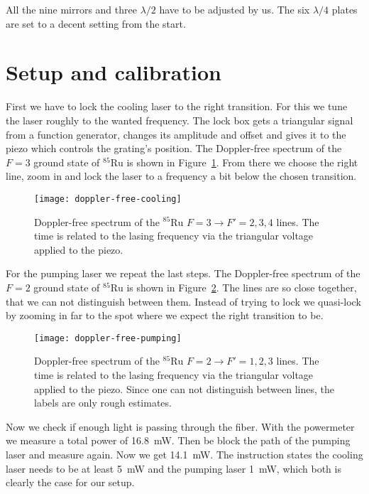 \documentclass[11pt, english, fleqn, DIV=15, headinclude, BCOR=2cm]{scrreprt}
\begin{document}
All the nine mirrors and three $\lambda/2$ have to be adjusted by us. The
six $\lambda/4$ plates are set to a decent setting from the start.

\section{Setup and calibration}

First we have to lock the cooling laser to the right transition. For this we
tune the laser roughly to the wanted frequency. The lock box gets a triangular
signal from a function generator, changes its amplitude and offset and gives it
to the piezo which controls the grating's position. The Doppler-free spectrum of
the $F=3$ ground state of ${}^{85}\text{Ru}$ is shown in
Figure~\ref{fig:doppler-free-cooling}. From there we choose the right line,
zoom in and lock the laser to a frequency a bit below the chosen transition. 

\begin{figure}
    \centering
    \texttt{[image: doppler-free-cooling]}
    \caption{%
        Doppler-free spectrum of the ${}^{85}\text{Ru}$ $F=3 \to F'=2,3,4$
        lines. The time is related to the lasing frequency via the triangular
        voltage applied to the piezo.
    }
    \label{fig:doppler-free-cooling}
\end{figure}

For the pumping laser we repeat the last steps. The Doppler-free spectrum of the
$F=2$ ground state of ${}^{85}\text{Ru}$ is shown in
Figure~\ref{fig:doppler-free-pumping}. The lines are so close together, that we
can not distinguish between them. Instead of trying to lock we quasi-lock by
zooming in far to the spot where we expect the right transition to be.

\begin{figure}
    \centering
    \texttt{[image: doppler-free-pumping]}
    \caption{%
        Doppler-free spectrum of the ${}^{85}\text{Ru}$ $F=2 \to F'=1,2,3$
        lines. The time is related to the lasing frequency via the triangular
        voltage applied to the piezo. Since one can not distinguish between
        lines, the labels are only rough estimates. 
    }
    \label{fig:doppler-free-pumping}
\end{figure}

Now we check if enough light is passing through the fiber. With the
powermeter we measure a total power of \SI{16.8}{\milli\watt}. Then be block
the path of the pumping laser and measure again. Now we get
\SI{14.1}{\milli\watt}. The instruction states the cooling laser needs to be at
least \SI{5}{\milli\watt} and the pumping laser \SI{1}{\milli\watt}, which both
is clearly the case for our setup.
\end{document}
